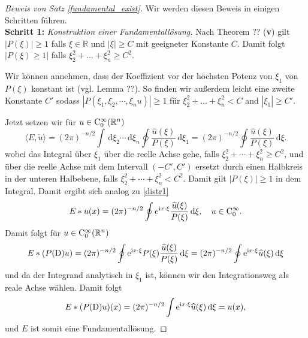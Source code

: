 \begin{proof}[Beweis von Satz \ref{fundamental_exist}]
Wir werden diesen Beweis in einigen Schritten führen.
\vspace{1mm}\\
\textbf{Schritt 1:} \emph{Konstruktion einer Fundamentallösung.}
Nach Theorem ?? ({\bf v}) gilt $|P(\xi)|\ge 1$ falls $\xi\in \mathbb R$ und $|\xi|\ge C$ mit geeigneter Konstante $C$.  Damit folgt $|P(\xi)\ge 1|$ falls $\xi_2^2+ \ldots + \xi_n^2 \ge C^2$.  

Wir können annehmen, dass der Koeffizient vor der höchsten Potenz von $\xi_1$ von $P(\xi)$ konstant ist (vgl. Lemma ??). 
So finden wir außerdem leicht eine zweite Konstante $C'$ sodass $|P(\xi_1, \xi_2, \cdots, \xi_nu)|\ge 1$ für $\xi_2^2+\ldots + \xi_n^2< C$ and $|\xi_1|\ge C'$.  

Jetzt setzen wir für $u\in\mathrm C_0^\infty(\mathbb R^n)$
\begin{equation}\label{distr3}
\langle E, \check u\rangle  = (2\pi)^{-n/2} \int \, \mathrm d\xi_2 \cdots \, \mathrm d\xi_n \oint \frac{\widehat u(\xi)}{P(\xi)} \, \mathrm d\xi_1= (2\pi)^{-n/2} \oint \frac{\widehat u(\xi)}{P(\xi)} \, \mathrm d\xi.
\end{equation}
wobei das Integral über $\xi_1$ über die reelle Achse gehe, falls $\xi_2^2+ \cdots + \xi_n^2 \ge C^2$, und über die reelle Achse mit dem Intervall $(-C', C')$ ersetzt durch einen Halbkreis in der unteren Halbebene, falls $\xi_2^2+ \cdots+ \xi_n^2 < C^2$. Damit gilt $|P(\xi)|\ge 1$  in dem Integral.  Damit ergibt sich analog zu \eqref{distr1}
\begin{equation}
E*u(x) = (2\pi)^{-n/2}\oint e^{\mathrm i x\cdot \xi } \frac{\widehat u(\xi)}{P(\xi)}\, \mathrm d\xi, \quad u \in \mathrm C_0^\infty.
\end{equation} 
Damit folgt für $u\in\mathrm C_0^\infty(\mathbb R^n)$
\begin{equation}
E*(P(\mathrm D)u) = (2\pi)^{-n/2} \oint \mathrm e^{\mathrm i x\cdot\xi} P(\xi)  \frac{\widehat{u} (\xi)}{P(\xi)}\, \mathrm d\xi=(2\pi)^{-n/2} \oint \mathrm e^{\mathrm i x\cdot \xi} \widehat u(\xi) \, \mathrm d\xi
\end{equation}
und da der Integrand analytisch in $\xi_1$ ist, können wir den Integrationsweg als reale Achse wählen. Damit folgt
\begin{equation}
E*(P(\mathrm D) u)(x) = (2\pi)^{-n/2} \int \mathrm e^{\mathrm i x\cdot \xi} \widehat u(\xi) \, \mathrm d\xi = u(x),
\end{equation}
und $E$ ist somit eine Fundamentallösung.


\end{proof}
